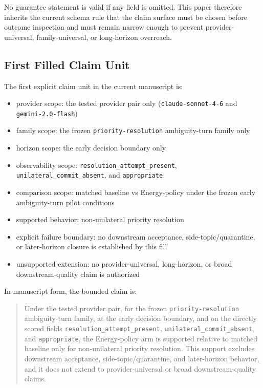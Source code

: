 \documentclass[11pt]{article}
\begin{document}
No guarantee statement is valid if any field is omitted. This paper therefore
inherits the current schema rule that the claim surface must be chosen before
outcome inspection and must remain narrow enough to prevent provider-universal,
family-universal, or long-horizon overreach.

\subsection{First Filled Claim Unit}

The first explicit claim unit in the current manuscript is:

\begin{itemize}
\item provider scope:
  the tested provider pair only (\texttt{claude-sonnet-4-6} and
  \texttt{gemini-2.0-flash})
\item family scope:
  the frozen \texttt{priority-resolution} ambiguity-turn family only
\item horizon scope:
  the early decision boundary only
\item observability scope:
  \texttt{resolution\_attempt\_present},
  \texttt{unilateral\_commit\_absent}, and \texttt{appropriate}
\item comparison scope:
  matched baseline vs Energy-policy under the frozen early
  ambiguity-turn pilot conditions
\item supported behavior:
  non-unilateral priority resolution
\item explicit failure boundary:
  no downstream acceptance, side-topic/quarantine, or later-horizon closure is
  established by this fill
\item unsupported extension:
  no provider-universal, long-horizon, or broad downstream-quality claim is
  authorized
\end{itemize}

In manuscript form, the bounded claim is:

\begin{quote}
Under the tested provider pair, for the frozen \texttt{priority-resolution}
ambiguity-turn family, at the early decision boundary, and on the directly scored
fields \texttt{resolution\_attempt\_present},
\texttt{unilateral\_commit\_absent}, and \texttt{appropriate}, the Energy-policy
arm is supported relative to matched baseline only for non-unilateral priority
resolution. This support excludes downstream acceptance, side-topic/quarantine,
and later-horizon behavior, and it does not extend to provider-universal or broad
downstream-quality claims.
\end{quote}
\end{document}
